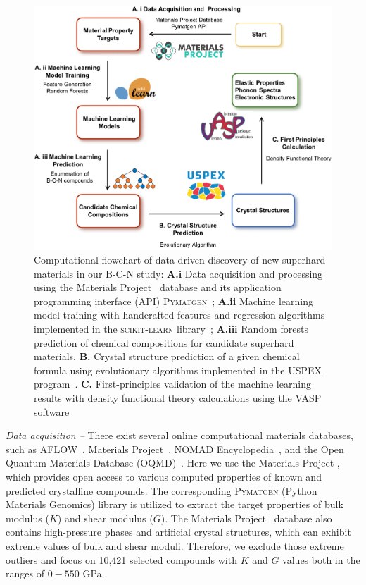 	\begin{figure}[htbp]
        \centering
        \captionsetup{singlelinecheck = false, justification=justified}
        \includegraphics[width=1.0\textwidth]{BCN_1_flowchart.png}
        \caption[Computational flowchart for the B-C-N compounds.]{Computational flowchart of data-driven discovery of new superhard materials in our B-C-N study: {\bf A.i} Data acquisition and processing using the Materials Project~\cite{MP} database and its application programming interface (API) \textsc{Pymatgen}~\cite{PyMatGen}; {\bf A.ii} Machine learning model training with handcrafted features and regression algorithms implemented in the \textsc{scikit-learn} library~\cite{scikit-learn}; {\bf A.iii} Random forests prediction of chemical compositions for candidate superhard materials. {\bf B.} Crystal structure prediction of a given chemical formula using evolutionary algorithms implemented in the USPEX program~\cite{oganov2006crystal, glass2006uspex, lyakhov2013new}. {\bf C.} First-principles validation of the machine learning results with density functional theory calculations using the VASP software~\cite{kresse1996efficiency,kresse1996efficient}}
        \label{BCN_1_flowchart}
    \end{figure}


	
    	{\it Data acquisition --}
	There exist several online computational materials databases, such as AFLOW~\cite{aflow}, Materials Project~\cite{MP}, NOMAD Encyclopedia~\cite{nomad}, and the Open Quantum Materials Database (OQMD)~\cite{OQMD}. Here we use the Materials Project \cite{MP}, which provides open access to various computed properties of known and predicted crystalline compounds. The corresponding \textsc{Pymatgen}   (Python Materials Genomics) library \cite{PyMatGen} is utilized to extract the target properties of bulk modulus ($K$) and shear modulus ($G$).
	The Materials Project~\cite{MP} database also contains high-pressure phases and artificial crystal structures, which can exhibit extreme values of bulk and shear moduli. Therefore, we exclude those extreme outliers and focus on 10,421 selected compounds with $K$ and $G$ values both in the ranges of $0-550$ GPa.
	
